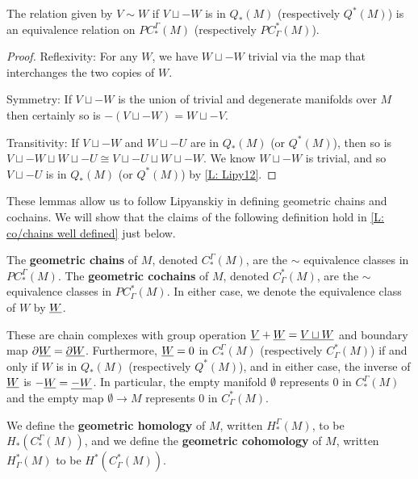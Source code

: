 \begin{lemma}\label{L: cancel Q}
	The relation given by $V\sim W$ if $V \sqcup -W$ is in $Q_*(M)$ (respectively $Q^*(M)$) is an equivalence relation on $PC^\Gamma_*(M)$ (respectively $PC_\Gamma^*(M)$).
\end{lemma}

\begin{proof}
	Reflexivity: For any $W$, we have $W \sqcup -W$ trivial via the map that interchanges the two copies of $W$.

	Symmetry: If $V \sqcup -W$ is the union of trivial and degenerate manifolds over $M$ then certainly so is $-(V \sqcup -W) = W \sqcup -V$.

	Transitivity: If $V \sqcup -W$ and $W \sqcup -U$ are in $Q_*(M)$ (or $Q^*(M)$), then so is $V \sqcup -W \sqcup W \sqcup -U \cong V \sqcup -U \sqcup W \sqcup -W$.
	We know $W \sqcup -W$ is trivial, and so $V \sqcup -U$ is in $Q_*(M)$ (or $Q^*(M)$) by \cref{L: Lipy12}.
\end{proof}

These lemmas allow us to follow Lipyanskiy in defining geometric chains and cochains.
We will show that the claims of the following definition hold in \cref{L: co/chains well defined} just below.

\begin{definition}\label{D: chains and cochains}
	The \textbf{geometric chains} of $M$, denoted $C^\Gamma_*(M)$, are the $\sim$ equivalence classes in $PC^\Gamma_*(M)$.
	The \textbf{geometric cochains} of $M$, denoted $C_\Gamma^*(M)$, are the $\sim$ equivalence classes in $PC_\Gamma^*(M)$.
	In either case, we denote the equivalence class of $W$ by $\underline{W}$.

	These are chain complexes with group operation $\underline{V} + \underline{W} = \underline{V \sqcup W}$ and boundary map $\partial \underline{W} = \underline{\partial W}$.
	Furthermore, $\underline{W} = 0$ in $C^\Gamma_*(M)$ (respectively $C_\Gamma^*(M)$) if and only if $W$ is in $Q_*(M)$ (respectively $Q^*(M)$), and in either case, the inverse of $\underline{W}$ is $-\underline{W} = \underline{-W}$.
	In particular, the empty manifold $\emptyset$ represents $0$ in $C^\Gamma_*(M)$ and the empty map $\emptyset \to M$ represents $0$ in $C^*_\Gamma(M)$.

	We define the \textbf{geometric homology} of $M$, written $H_*^\Gamma(M)$, to be $H_*(C^\Gamma_*(M))$, and
	we define the \textbf{geometric cohomology} of $M$, written $H^*_\Gamma(M)$ to be $H^*(C_\Gamma^*(M))$.
\end{definition}

